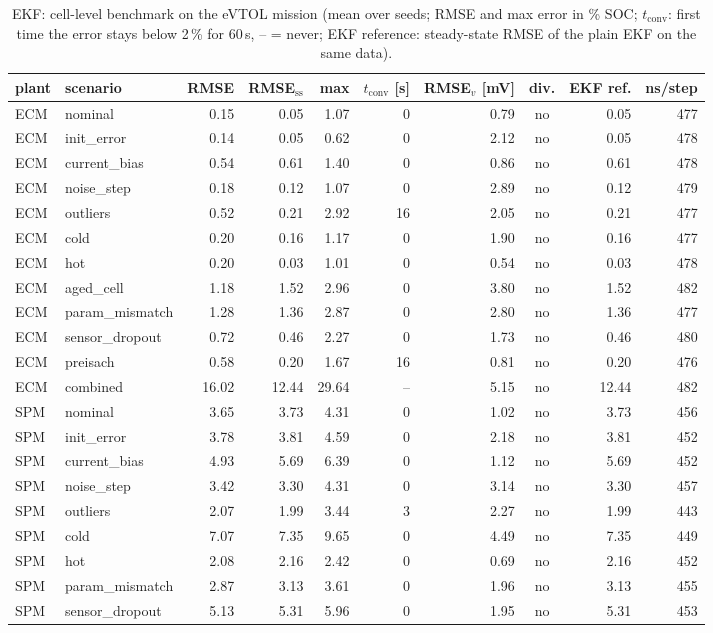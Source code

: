 \begin{table}[H]\centering\footnotesize\setlength{\tabcolsep}{4pt}
\caption{EKF: cell-level benchmark on the eVTOL mission (mean over seeds; RMSE and max error in \% SOC; $t_\mathrm{conv}$: first time the error stays below 2\,\% for 60\,s, -- = never; EKF reference: steady-state RMSE of the plain EKF on the same data).}\label{tab:cell_EKF}
\begin{tabular}{llrrrrrcrr}\toprule
plant & scenario & RMSE & RMSE$_\mathrm{ss}$ & max & $t_\mathrm{conv}$ [s] & RMSE$_v$ [mV] & div. & EKF ref. & ns/step \\ \midrule
ECM & nominal & 0.15 & 0.05 & 1.07 & 0 & 0.79 & no & 0.05 & 477 \\
ECM & init\_error & 0.14 & 0.05 & 0.62 & 0 & 2.12 & no & 0.05 & 478 \\
ECM & current\_bias & 0.54 & 0.61 & 1.40 & 0 & 0.86 & no & 0.61 & 478 \\
ECM & noise\_step & 0.18 & 0.12 & 1.07 & 0 & 2.89 & no & 0.12 & 479 \\
ECM & outliers & 0.52 & 0.21 & 2.92 & 16 & 2.05 & no & 0.21 & 477 \\
ECM & cold & 0.20 & 0.16 & 1.17 & 0 & 1.90 & no & 0.16 & 477 \\
ECM & hot & 0.20 & 0.03 & 1.01 & 0 & 0.54 & no & 0.03 & 478 \\
ECM & aged\_cell & 1.18 & 1.52 & 2.96 & 0 & 3.80 & no & 1.52 & 482 \\
ECM & param\_mismatch & 1.28 & 1.36 & 2.87 & 0 & 2.80 & no & 1.36 & 477 \\
ECM & sensor\_dropout & 0.72 & 0.46 & 2.27 & 0 & 1.73 & no & 0.46 & 480 \\
ECM & preisach & 0.58 & 0.20 & 1.67 & 16 & 0.81 & no & 0.20 & 476 \\
ECM & combined & 16.02 & 12.44 & 29.64 & -- & 5.15 & no & 12.44 & 482 \\
\midrule
SPM & nominal & 3.65 & 3.73 & 4.31 & 0 & 1.02 & no & 3.73 & 456 \\
SPM & init\_error & 3.78 & 3.81 & 4.59 & 0 & 2.18 & no & 3.81 & 452 \\
SPM & current\_bias & 4.93 & 5.69 & 6.39 & 0 & 1.12 & no & 5.69 & 452 \\
SPM & noise\_step & 3.42 & 3.30 & 4.31 & 0 & 3.14 & no & 3.30 & 457 \\
SPM & outliers & 2.07 & 1.99 & 3.44 & 3 & 2.27 & no & 1.99 & 443 \\
SPM & cold & 7.07 & 7.35 & 9.65 & 0 & 4.49 & no & 7.35 & 449 \\
SPM & hot & 2.08 & 2.16 & 2.42 & 0 & 0.69 & no & 2.16 & 452 \\
SPM & param\_mismatch & 2.87 & 3.13 & 3.61 & 0 & 1.96 & no & 3.13 & 455 \\
SPM & sensor\_dropout & 5.13 & 5.31 & 5.96 & 0 & 1.95 & no & 5.31 & 453 \\
\bottomrule\end{tabular}\end{table}
